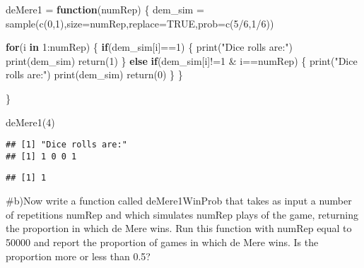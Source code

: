 \documentclass[
]{article}
\newenvironment{Shaded}{\begin{snugshade}}{\end{snugshade}}
\newcommand{\AttributeTok}[1]{\textcolor[rgb]{0.77,0.63,0.00}{#1}}
\newcommand{\ConstantTok}[1]{\textcolor[rgb]{0.00,0.00,0.00}{#1}}
\newcommand{\ControlFlowTok}[1]{\textcolor[rgb]{0.13,0.29,0.53}{\textbf{#1}}}
\newcommand{\DecValTok}[1]{\textcolor[rgb]{0.00,0.00,0.81}{#1}}
\newcommand{\FunctionTok}[1]{\textcolor[rgb]{0.00,0.00,0.00}{#1}}
\newcommand{\NormalTok}[1]{#1}
\newcommand{\OtherTok}[1]{\textcolor[rgb]{0.56,0.35,0.01}{#1}}
\newcommand{\SpecialCharTok}[1]{\textcolor[rgb]{0.00,0.00,0.00}{#1}}
\newcommand{\StringTok}[1]{\textcolor[rgb]{0.31,0.60,0.02}{#1}}
\begin{document}
\begin{Shaded}
\begin{Highlighting}[]
\NormalTok{deMere1 }\OtherTok{=} \ControlFlowTok{function}\NormalTok{(numRep)}
\NormalTok{\{}
\NormalTok{  dem\_sim }\OtherTok{=} \FunctionTok{sample}\NormalTok{(}\FunctionTok{c}\NormalTok{(}\DecValTok{0}\NormalTok{,}\DecValTok{1}\NormalTok{),}\AttributeTok{size=}\NormalTok{numRep,}\AttributeTok{replace=}\ConstantTok{TRUE}\NormalTok{,}\AttributeTok{prob=}\FunctionTok{c}\NormalTok{(}\DecValTok{5}\SpecialCharTok{/}\DecValTok{6}\NormalTok{,}\DecValTok{1}\SpecialCharTok{/}\DecValTok{6}\NormalTok{))}
  
  \ControlFlowTok{for}\NormalTok{(i }\ControlFlowTok{in} \DecValTok{1}\SpecialCharTok{:}\NormalTok{numRep)}
\NormalTok{  \{}
    \ControlFlowTok{if}\NormalTok{(dem\_sim[i]}\SpecialCharTok{==}\DecValTok{1}\NormalTok{)}
\NormalTok{    \{}
      \FunctionTok{print}\NormalTok{(}\StringTok{"Dice rolls are:"}\NormalTok{)}
      \FunctionTok{print}\NormalTok{(dem\_sim)}
      \FunctionTok{return}\NormalTok{(}\DecValTok{1}\NormalTok{)}
\NormalTok{    \}}
     \ControlFlowTok{else} \ControlFlowTok{if}\NormalTok{(dem\_sim[i]}\SpecialCharTok{!=}\DecValTok{1} \SpecialCharTok{\&}\NormalTok{ i}\SpecialCharTok{==}\NormalTok{numRep)}
\NormalTok{    \{}
      \FunctionTok{print}\NormalTok{(}\StringTok{"Dice rolls are:"}\NormalTok{)}
      \FunctionTok{print}\NormalTok{(dem\_sim)}
      \FunctionTok{return}\NormalTok{(}\DecValTok{0}\NormalTok{)}
\NormalTok{    \}}
\NormalTok{  \}}
  
\NormalTok{\}}
\end{Highlighting}
\end{Shaded}

\begin{Shaded}
\begin{Highlighting}[]
\FunctionTok{deMere1}\NormalTok{(}\DecValTok{4}\NormalTok{)}
\end{Highlighting}
\end{Shaded}

\begin{verbatim}
## [1] "Dice rolls are:"
## [1] 1 0 0 1
\end{verbatim}

\begin{verbatim}
## [1] 1
\end{verbatim}

\#b)Now write a function called deMere1WinProb that takes as input a
number of repetitions numRep and which simulates numRep plays of the
game, returning the proportion in which de Mere wins. Run this function
with numRep equal to 50000 and report the proportion of games in which
de Mere wins. Is the proportion more or less than 0.5?
\end{document}
